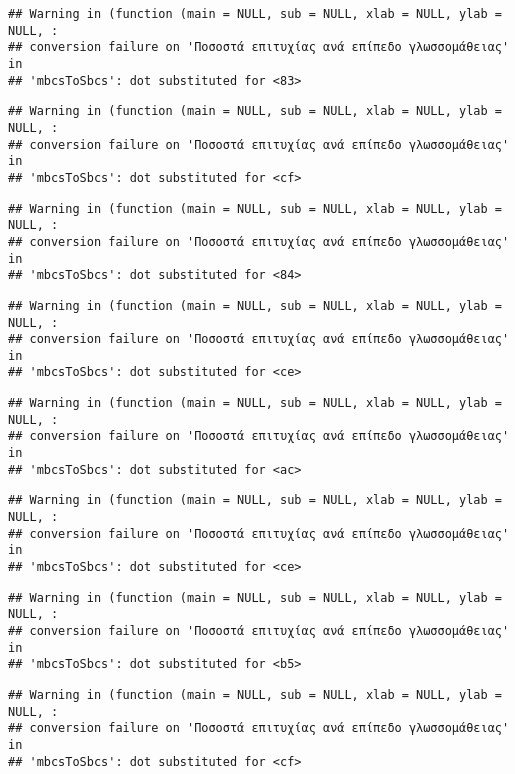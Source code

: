 \documentclass[
]{article}
\begin{document}
\begin{verbatim}
## Warning in (function (main = NULL, sub = NULL, xlab = NULL, ylab = NULL, :
## conversion failure on 'Ποσοστά επιτυχίας ανά επίπεδο γλωσσομάθειας' in
## 'mbcsToSbcs': dot substituted for <83>
\end{verbatim}

\begin{verbatim}
## Warning in (function (main = NULL, sub = NULL, xlab = NULL, ylab = NULL, :
## conversion failure on 'Ποσοστά επιτυχίας ανά επίπεδο γλωσσομάθειας' in
## 'mbcsToSbcs': dot substituted for <cf>
\end{verbatim}

\begin{verbatim}
## Warning in (function (main = NULL, sub = NULL, xlab = NULL, ylab = NULL, :
## conversion failure on 'Ποσοστά επιτυχίας ανά επίπεδο γλωσσομάθειας' in
## 'mbcsToSbcs': dot substituted for <84>
\end{verbatim}

\begin{verbatim}
## Warning in (function (main = NULL, sub = NULL, xlab = NULL, ylab = NULL, :
## conversion failure on 'Ποσοστά επιτυχίας ανά επίπεδο γλωσσομάθειας' in
## 'mbcsToSbcs': dot substituted for <ce>
\end{verbatim}

\begin{verbatim}
## Warning in (function (main = NULL, sub = NULL, xlab = NULL, ylab = NULL, :
## conversion failure on 'Ποσοστά επιτυχίας ανά επίπεδο γλωσσομάθειας' in
## 'mbcsToSbcs': dot substituted for <ac>
\end{verbatim}

\begin{verbatim}
## Warning in (function (main = NULL, sub = NULL, xlab = NULL, ylab = NULL, :
## conversion failure on 'Ποσοστά επιτυχίας ανά επίπεδο γλωσσομάθειας' in
## 'mbcsToSbcs': dot substituted for <ce>
\end{verbatim}

\begin{verbatim}
## Warning in (function (main = NULL, sub = NULL, xlab = NULL, ylab = NULL, :
## conversion failure on 'Ποσοστά επιτυχίας ανά επίπεδο γλωσσομάθειας' in
## 'mbcsToSbcs': dot substituted for <b5>
\end{verbatim}

\begin{verbatim}
## Warning in (function (main = NULL, sub = NULL, xlab = NULL, ylab = NULL, :
## conversion failure on 'Ποσοστά επιτυχίας ανά επίπεδο γλωσσομάθειας' in
## 'mbcsToSbcs': dot substituted for <cf>
\end{verbatim}
\end{document}
